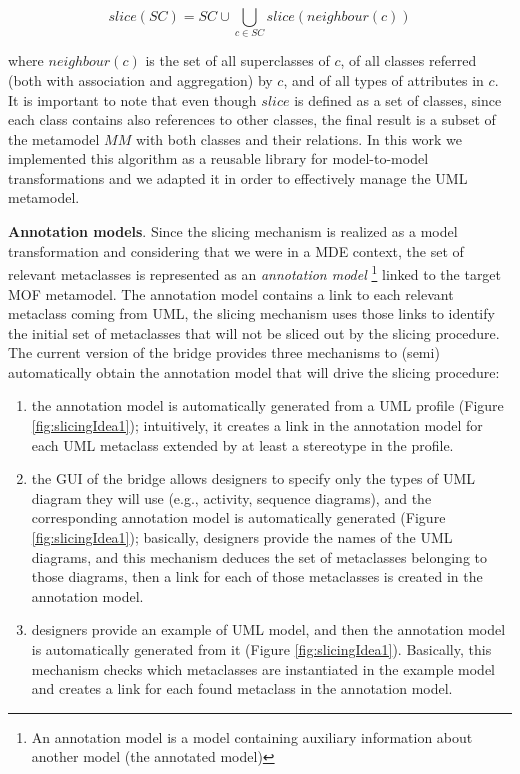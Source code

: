 \vspace{-.2cm}
$$slice(SC)=SC \cup \displaystyle\bigcup_{c \in
SC}{slice(neighbour(c))}$$
\vspace{-.2cm}

\noindent where $neighbour(c)$ is the set of all superclasses of
$c$, of all classes referred (both with association and
aggregation) by $c$, and of all types of attributes in $c$.
It is important to note that even though $slice$ is defined
as a set of classes, since each class contains also references
to other classes, the final result is a subset of the metamodel $MM$
with both classes and their relations. In this work we implemented this algorithm as a reusable library for model-to-model transformations 
and we adapted it in order to effectively manage the UML metamodel. 

\textbf{Annotation models}. Since the slicing mechanism is realized as a model transformation and considering that we were in a MDE context, the set of relevant
metaclasses is represented as an \textit{annotation model}
\footnote{An annotation model is a model containing auxiliary information about another model (the annotated model)\cite{MCDFthesis}} linked to the target MOF metamodel. 
The annotation model contains a link to each relevant metaclass coming from UML, the slicing mechanism uses those links to identify the initial set of
metaclasses that will not be sliced out by the slicing procedure.
The current version of the bridge provides three mechanisms to (semi) automatically obtain the annotation model that will drive the slicing procedure:
%
\begin{enumerate}
	\item the annotation model is automatically generated from a UML profile (Figure \ref{fig:slicingIdea1}); intuitively, it creates a link in the annotation model
	for each UML metaclass extended by at least a stereotype in the profile.  
	\item the GUI of the bridge allows designers to specify only the types of UML diagram they will use (e.g., activity, sequence diagrams), and the corresponding annotation model
	is automatically generated (Figure \ref{fig:slicingIdea1}); basically, designers provide the names of the UML diagrams, and this mechanism deduces the set of metaclasses belonging to those diagrams, then a link for each of those metaclasses is created in the annotation model.
	\item designers provide an example of UML model, and then the annotation model is automatically generated from it (Figure \ref{fig:slicingIdea1}). 
	Basically, this mechanism checks which metaclasses are instantiated in the example model and creates a link for each found metaclass in the annotation model.
\end{enumerate}
